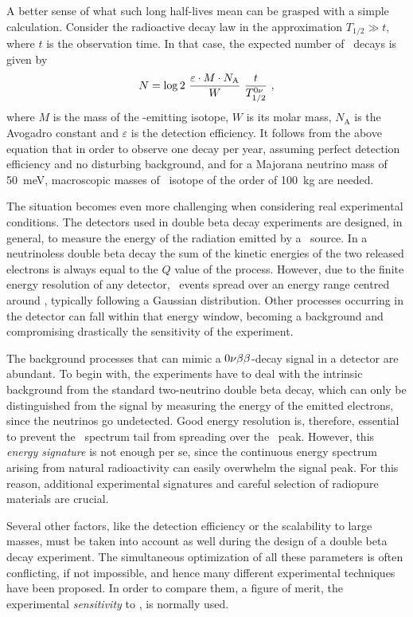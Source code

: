 \documentclass{PoS}
\begin{document}
A better sense of what such long half-lives mean can be grasped with a simple calculation. Consider the radioactive decay law in the approximation $T_{1/2}\gg t$, where $t$ is the observation time. In that case, the expected number of \bbonu\ decays is given by
\begin{equation}
N = \log2\ \frac{\varepsilon\cdot M \cdot N_\mathrm{A}}{W}\ \frac{t}{\Tonu}\ , \label{eq:Nbb}
\end{equation}
where $M$ is the mass of the \bb-emitting isotope, $W$ is its molar mass, $N_\mathrm{A}$ is the Avogadro constant and $\varepsilon$ is the detection efficiency. It follows from the above equation that in order to observe one decay per year, assuming perfect detection efficiency and no disturbing background, and for a Majorana neutrino mass of 50~meV, macroscopic masses of \bb\ isotope of the order of 100~kg are needed.

The situation becomes even more challenging when considering real experimental conditions. The detectors used in double beta decay experiments are designed, in general, to measure the energy of the radiation emitted by a \bb\ source. In a neutrinoless double beta decay the sum of the kinetic energies of the two released electrons is always equal to the $Q$ value of the process. However, due to the finite energy resolution of any detector, \bbonu\ events spread over an energy range centred around \Qbb, typically following a Gaussian distribution. Other processes occurring in the detector can fall within that energy window, becoming a background and compromising drastically the sensitivity of the experiment.

The background processes that can mimic a $0\nu\beta\beta$-decay signal in a detector are abundant. To begin with, the experiments have to deal with the intrinsic background from the standard two-neutrino double beta decay, which can only be distinguished from the signal by measuring the energy of the emitted electrons, since the neutrinos go undetected. Good energy resolution is, therefore, essential to prevent the \bbtnu\ spectrum tail from spreading over the \bbonu\ peak. However, this \emph{energy signature} is not enough per se, since the continuous energy spectrum arising from natural radioactivity can easily overwhelm the signal peak. For this reason, additional experimental signatures and careful selection of radiopure materials are crucial. 

Several other factors, like the detection efficiency or the scalability to large masses, must be taken into account as well during the design of a double beta decay experiment. The simultaneous optimization of all these parameters is often conflicting, if not impossible, and hence many different experimental techniques have been proposed. In order to compare them, a figure of merit, the experimental \emph{sensitivity} to \mbb, is normally used. 
\end{document}
